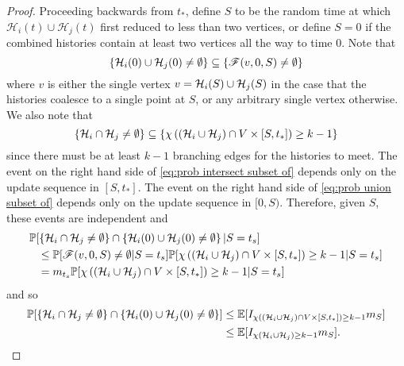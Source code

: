 \begin{proof}
		Proceeding backwards from $t_*$, define $S$ to be the random time at which $\mathcal{H}_i(t) \cup \mathcal{H}_j(t)$ first reduced to less than two vertices, or define $S = 0$ if the combined histories contain at least two vertices all the way to time $0$. 
		Note that
		\begin{equation}
			\label{eq:prob union subset of}
			\{\mathcal{H}_i(0) \cup \mathcal{H}_j(0) \neq \emptyset\} \subseteq \{\mathscr{F}(v, 0, S) \neq \emptyset\}
		\end{equation}
		where $v$ is either the single vertex $v = \mathcal{H}_i(S) \cup\mathcal{H}_j(S)$ in the case that the histories coalesce to a single point at $S$, or any arbitrary single vertex otherwise.
		We also note that
		\begin{equation}
			\label{eq:prob intersect subset of}
			\{\mathcal{H}_i \cap \mathcal{H}_j \neq \emptyset\} \subseteq \{\chi\left((\mathcal{H}_i \cup \mathcal{H}_j)\cap V \times [S, t_*]\right) \geq k - 1\}
		\end{equation}
		since there must be at least $k - 1$ branching edges for the histories to meet. The event on the right hand side of \eqref{eq:prob intersect subset of} depends only on the update sequence in $[S, t_*]$. The event on the right hand side of \eqref{eq:prob union subset of} depends only on the update sequence in $[0, S)$. Therefore, given $S$, these events are independent and
		\begin{align}
			&\mathbb{P}[\left\{\mathcal{H}_i \cap \mathcal{H}_j \neq \emptyset\right\} \cap \left\{\mathcal{H}_i(0) \cup \mathcal{H}_j(0) \neq \emptyset\right\}| S = t_s] \notag \\
			&\phantom{=}\leq \mathbb{P}[\mathscr{F}(v, 0, S) \neq \emptyset | S = t_s] \mathbb{P}[\chi\left((\mathcal{H}_i \cup \mathcal{H}_j)\cap V \times [S, t_*]\right) \geq k - 1 | S = t_s]\\
			&\phantom{=}= m_{t_s}  \mathbb{P}[\chi\left((\mathcal{H}_i \cup \mathcal{H}_j)\cap V \times [S, t_*]\right) \geq k - 1 | S = t_s]
		\end{align}
		and so
		\begin{align}
			\mathbb{P}[\left\{\mathcal{H}_i \cap \mathcal{H}_j \neq \emptyset\right\} \cap \left\{\mathcal{H}_i(0) \cup \mathcal{H}_j(0) \neq \emptyset\right\}] &\leq \mathbb{E}[I_{\chi\left((\mathcal{H}_i \cup \mathcal{H}_j)\cap V \times [S, t_*]\right) \geq k - 1 }m_S]\\
			&\leq \mathbb{E}[I_{\chi(\mathcal{H}_i \cup \mathcal{H}_j) \geq k - 1} m_S].
		\end{align}

\end{proof}
